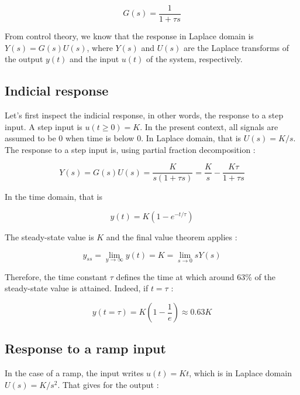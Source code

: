 \begin{equation}
G(s) = \frac{1}{1+\tau s}
\end{equation}

\noindent From control theory, we know that the response in Laplace domain is $Y(s) = G(s)U(s)$, where $Y(s)$ and $U(s)$ are the Laplace transforms of the output $y(t)$ and the input $u(t)$ of the system, respectively.

\subsection{Indicial response}

Let's first inspect the indicial response, in other words, the response to a step input. A step input is $u(t \geq 0) = K$. In the present context, all signals are assumed to be $0$ when time is below 0. In Laplace domain, that is $U(s) = K/s$. The response to a step input is, using partial fraction decomposition : 

\begin{equation}
Y(s) = G(s)U(s) = \frac{K}{s(1+\tau s)} =\frac{K}{s} - \frac{K\tau}{1+\tau s}
\end{equation}

\noindent In the time domain, that is 

\begin{equation}
y(t) = K(1-e^{-t/\tau})
\end{equation}

\noindent The steady-state value is $K$ and the final value theorem applies : 

\begin{equation}
y_{ss} = \lim_{y \rightarrow \infty} y(t) = K = \lim_{s \rightarrow 0} sY(s)
\end{equation}

Therefore, the time constant $\tau$ defines the time at which around 63\% of the steady-state value is attained. Indeed, if $t=\tau$ : 

\begin{equation}
y(t=\tau) = K(1-\frac{1}{e}) \approx 0.63K 
\end{equation}

\subsection{Response to a ramp input}

In the case of a ramp, the input writes $u(t) = Kt$, which is in Laplace domain $U(s) = K/s^2$. That gives for the output : 

